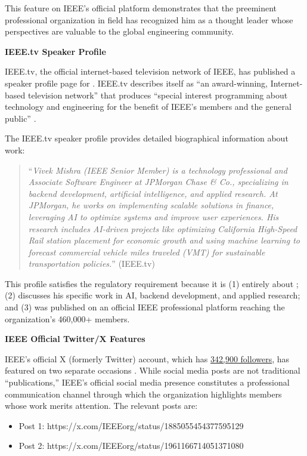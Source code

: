 This feature on IEEE's official platform demonstrates that the preeminent professional organization in \drs field has recognized him as a thought leader whose perspectives are valuable to the global engineering community.

\textbf{IEEE.tv Speaker Profile}

IEEE.tv, the official internet-based television network of IEEE, has published a speaker profile page for \dr. IEEE.tv describes itself as ``an award-winning, Internet-based television network'' that produces ``special interest programming about technology and engineering for the benefit of IEEE's members and the general public'' \cite{PM3}.

The IEEE.tv speaker profile provides detailed biographical information about \drs work:

\begin{quote}
``\textit{Vivek Mishra (IEEE Senior Member) is a technology professional and Associate Software Engineer at JPMorgan Chase \& Co., specializing in backend development, artificial intelligence, and applied research. At JPMorgan, he works on implementing scalable solutions in finance, leveraging AI to optimize systems and improve user experiences. His research includes AI-driven projects like optimizing California High-Speed Rail station placement for economic growth and using machine learning to forecast commercial vehicle miles traveled (VMT) for sustainable transportation policies.}'' (IEEE.tv)
\end{quote}

This profile satisfies the regulatory requirement because it is (1) entirely about \dr; (2) discusses his specific work in AI, backend development, and applied research; and (3) was published on an official IEEE professional platform reaching the organization's 460,000+ members.

\textbf{IEEE Official Twitter/X Features}

IEEE's official X (formerly Twitter) account, which has \underline{342,900 followers}, has featured \dr on two separate occasions \cite{PM4}. While social media posts are not traditional ``publications,'' IEEE's official social media presence constitutes a professional communication channel through which the organization highlights members whose work merits attention. The relevant posts are:
\begin{itemize}
    \item Post 1: https://x.com/IEEEorg/status/1885055454377595129
    \item Post 2: https://x.com/IEEEorg/status/1961166714051371080
\end{itemize}

